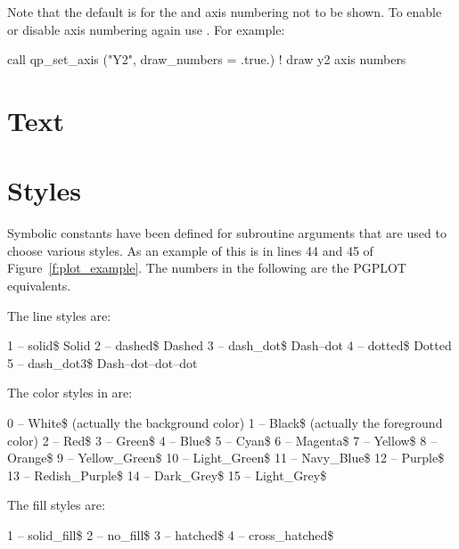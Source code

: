 Note that the default is for the  and  axis numbering
not to be shown. To enable or disable axis numbering again use
. For example:
\begin{example}
  call qp_set_axis ("Y2", draw_numbers = .true.)  ! draw y2 axis numbers
\end{example}

\section{Text}
\label{s:text}



\section{Styles}
\label{s:styles}

Symbolic constants have been defined for \quickplot subroutine
arguments that are used to choose various styles. As an example of
this is in lines 44 and 45 of Figure~\ref{f:plot_example}. The
numbers in the following are the PGPLOT equivalents.

The \quickplot line styles are:
\begin{example}
    1 -- solid\$                  Solid
    2 -- dashed\$                 Dashed
    3 -- dash_dot\$               Dash--dot 
    4 -- dotted\$                 Dotted
    5 -- dash_dot3\$              Dash--dot--dot--dot        
\end{example}

The color styles in \quickplot are:
\begin{example}
    0 -- White\$   (actually the background color)
    1 -- Black\$   (actually the foreground color)
    2 -- Red\$
    3 -- Green\$
    4 -- Blue\$
    5 -- Cyan\$
    6 -- Magenta\$
    7 -- Yellow\$ 
    8 -- Orange\$
    9 -- Yellow_Green\$
   10 -- Light_Green\$
   11 -- Navy_Blue\$
   12 -- Purple\$
   13 -- Redish_Purple\$
   14 -- Dark_Grey\$
   15 -- Light_Grey\$
\end{example}

The fill styles are:
\begin{example}
    1 -- solid_fill\$        
    2 -- no_fill\$           
    3 -- hatched\$           
    4 -- cross_hatched\$     
\end{example}

